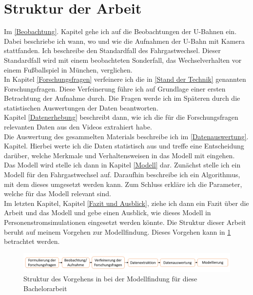 \section{Struktur der Arbeit} \label{Struktur der Arbeit}
Im \ref{Beobachtung}. Kapitel gehe ich auf die Beobachtungen der U-Bahnen ein. Dabei beschriebe ich wann, wo und wie die Aufnahmen der U-Bahn mit Kamera stattfanden. Ich beschreibe den Standardfall des Fahrgastwechsel. Dieser Standardfall wird mit einem beobachteten Sonderfall, das Wechselverhalten vor einem Fußballspiel in München, verglichen.\\
In Kapitel \ref{Forschungsfragen} verfeinere ich die in \ref{Stand der Technik} genannten Forschungsfragen. Diese Verfeinerung führe ich auf Grundlage einer ersten Betrachtung der Aufnahme durch. Die Fragen werde ich im Späteren durch die statistischen Auswertungen der Daten beantworten.\\
Kapitel \ref{Datenerhebung} beschreibt dann, wie ich die für die Forschungsfragen relevanten Daten aus den Videos extrahiert habe.\\
Die Auswertung des gesammelten Materials beschreibe ich im \ref{Datenauswertung}. Kapitel. Hierbei werte ich die Daten statistisch aus und treffe eine Entscheidung darüber, welche Merkmale und Verhaltensweisen in das Modell mit eingehen.\\
Das Modell wird stelle ich dann in Kapitel \ref{Modell} dar. Zunächst stelle ich ein Modell für den Fahrgastwechsel auf. Daraufhin beschreibe ich ein Algorithmus, mit dem dieses umgesetzt werden kann. Zum Schluss erkläre ich die Parameter, welche für das Modell relevant sind. \\
Im letzten Kapitel, Kapitel \ref{Fazit und Ausblick}, ziehe ich dann ein Fazit über die Arbeit und das Modell und gebe einen Ausblick, wie dieses Modell in Personenstromsimulationen eingesetzt werden könnte.
Die Struktur dieser Arbeit beruht auf meinem Vorgehen zur Modellfindung. Dieses Vorgehen kann in \figurename \ref{fig:Vorgehen} betrachtet werden.
\begin{figure}[H]
	\centering
		\includegraphics[width=1.0\textwidth]{pictures/introduction/strukture/strukture_work.png}
	\caption{Struktur des Vorgehens in bei der Modellfindung für diese Bachelorarbeit}
	\label{fig:Vorgehen}
\end{figure}
 
